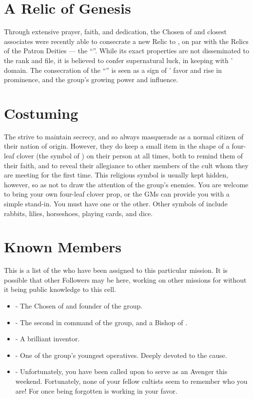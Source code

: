 \documentclass[blue]{GL2020}
\begin{document}
\section*{A Relic of Genesis}
Through extensive prayer, faith, and dedication, the Chosen of \cGenesis{} and \cChupLeader{\their} closest associates were recently able to consecrate a new Relic to \cGenesis{}, on par with the Relics of the Patron Deities — the ``\iHorseshoe{}''. While its exact properties are not disseminated to the rank and file, it is believed to confer supernatural luck, in keeping with \cGenesis{}' domain. The consecration of the ``\iHorseshoe{}'' is seen as a sign of \cGenesis{}' favor and rise in prominence, and the group's growing power and influence.

\section*{Costuming}
The \pGoaties{} strive to maintain secrecy, and so always masquerade as a normal citizen of their nation of origin. However, they do keep a small item in the shape of a four-leaf clover (the symbol of \cGenesis{}) on their person at all times, both to remind them of their faith, and to reveal their allegiance to other members of the cult whom they are meeting for the first time. This religious symbol is usually kept hidden, however, so as not to draw the attention of the group's enemies. You are welcome to bring your own four-leaf clover prop, or the GMs can provide you with a simple stand-in. You must have one or the other. Other symbols of \cGenesis{} include rabbits, lilies, horseshoes, playing cards, and dice.

\section*{Known Members}
This is a list of the \pGoaties{} who have been assigned to this particular mission. It is possible that other Followers may be here, working on other missions for \cGenesis{} without it being public knowledge to this cell.
\begin{itemize}
    \item \cChupLeader{\full} - The Chosen of \cGenesis{} and founder of the group.
    \item \cChupSecond{\full} - The second in command of the group, and a Bishop of \cGenesis{}.
    \item \cChupInventor{\full} - A brilliant inventor.
    \item \cChupStudent{\full} - One of the group's youngest operatives. Deeply devoted to the cause.
    \item \cChupAvenger{\full} - Unfortunately, you have been called upon to serve as an Avenger this weekend. Fortunately, none of your fellow cultists seem to remember who you are! For once being forgotten is working in your favor.
\end{itemize}
\end{document}
